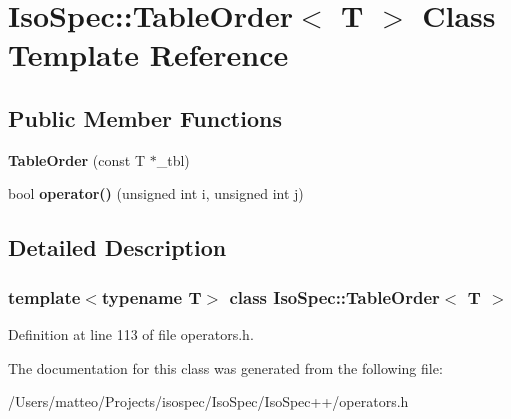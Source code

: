 \hypertarget{class_iso_spec_1_1_table_order}{}\section{Iso\+Spec\+:\+:Table\+Order$<$ T $>$ Class Template Reference}
\label{class_iso_spec_1_1_table_order}
\subsection*{Public Member Functions}
\begin{DoxyCompactItemize}
\item 
\mbox{\label{class_iso_spec_1_1_table_order_a82a2474a7990bf0a55e269ea2dabada5}} 
{\bfseries Table\+Order} (const T $\ast$\+\_\+tbl)
\item 
\mbox{\label{class_iso_spec_1_1_table_order_a35b990bbb3f8c3ba0551c0938a5145c8}} 
bool {\bfseries operator()} (unsigned int i, unsigned int j)
\end{DoxyCompactItemize}


\subsection{Detailed Description}
\subsubsection*{template$<$typename T$>$\newline
class Iso\+Spec\+::\+Table\+Order$<$ T $>$}



Definition at line 113 of file operators.\+h.



The documentation for this class was generated from the following file\+:\begin{DoxyCompactItemize}
\item 
/\+Users/matteo/\+Projects/isospec/\+Iso\+Spec/\+Iso\+Spec++/operators.\+h\end{DoxyCompactItemize}
